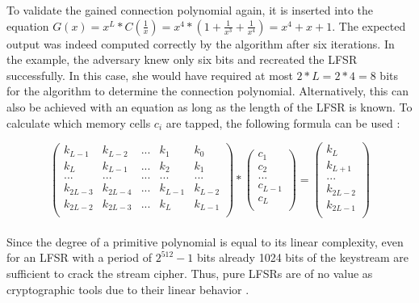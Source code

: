 To validate the gained connection polynomial again, it is inserted into the equation $G(x) = x^L * C(\frac{1}{x}) = x^4 * (1 + \frac{1}{x^3} + \frac{1}{x^4}) = x^4 + x + 1$. The expected output was indeed computed correctly by the algorithm after six iterations. In the example, the adversary knew only six bits and recreated the LFSR successfully. In this case, she would have required at most $2*L=2*4=8$ bits for the algorithm to determine the connection polynomial. Alternatively, this can also be achieved with an equation as long as the length of the LFSR is known. To calculate which memory cells $c_i$ are tapped, the following formula can be used \cite[p. 232]{Smart.2016}:

\[
	\begin{pmatrix}
		k_{L-1} & k_{L-2} & ... & k_1 & k_0 \\
		k_L & k_{L-1} & ... & k_2 & k_1 \\
		... & ... & ... & ... & ... \\
		k_{2L-3} & k_{2L-4} & ... & k_{L-1} & k_{L-2} \\
		k_{2L-2} & k_{2L-3} & ... & k_L & k_{L-1} \\
	\end{pmatrix} *
	\begin{pmatrix}
		c_1 \\
		c_2 \\
		... \\
		c_{L-1} \\
		c_{L} \\
	\end{pmatrix} =
	\begin{pmatrix}
		k_{L} \\
		k_{L+1} \\
		... \\
		k_{2L-2} \\
		k_{2L-1} \\
	\end{pmatrix}
\]\\

Since the degree of a primitive polynomial is equal to its linear complexity, even for an LFSR with a period of $2^{512}-1$ bits already 1024 bits of the keystream are sufficient to crack the stream cipher. Thus, pure LFSRs are of no value as cryptographic tools due to their linear behavior \cite[p. 231]{Smart.2016}.